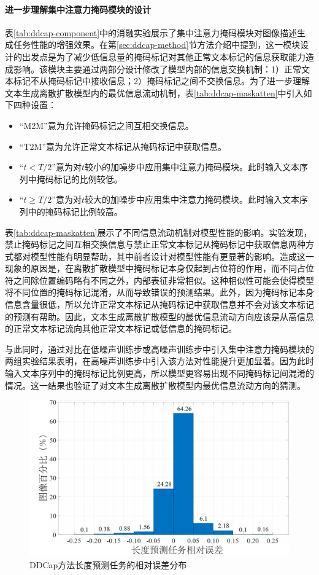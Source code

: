 \paragraph{进一步理解集中注意力掩码模块的设计} 表\ref{tab:ddcap-component}中的消融实验展示了集中注意力掩码模块对图像描述生成任务性能的增强效果。在第\ref{sec:ddcap-method}节方法介绍中提到，这一模块设计的出发点是为了减少低信息量的掩码标记对其他正常文本标记的信息获取能力造成影响。该模块主要通过两部分设计修改了模型内部的信息交换机制：1）正常文本标记不从掩码标记中接收信息；2）掩码标记之间不交换信息。为了进一步理解文本生成离散扩散模型内的最优信息流动机制，表\ref{tab:ddcap-maskatten}中引入如下四种设置：
\begin{itemize}
    \item “M2M”意为允许掩码标记之间互相交换信息。
    \item “T2M”意为允许正常文本标记从掩码标记中获取信息。
    \item “$t < T/2$”意为对$t$较小的加噪步中应用集中注意力掩码模块。此时输入文本序列中掩码标记的比例较低。
    \item “$t\geq T/2$”意为对$t$较大的加噪步中应用集中注意力掩码模块。此时输入文本序列中的掩码标记比例较高。
\end{itemize}
 
表\ref{tab:ddcap-maskatten}展示了不同信息流动机制对模型性能的影响。实验发现，禁止掩码标记之间互相交换信息与禁止正常文本标记从掩码标记中获取信息两种方式都对模型性能有明显帮助，其中前者设计对模型性能有更显著的影响。造成这一现象的原因是，在离散扩散模型中掩码标记本身仅起到占位符的作用，而不同占位符之间除位置编码略有不同之外，内部表征非常相似。这种相似性可能会使得模型将不同位置的掩码标记混淆，从而导致错误的预测结果。此外，因为掩码标记本身信息含量很低，所以允许正常文本标记从掩码标记中获取信息并不会对该文本标记的预测有帮助。因此，文本生成离散扩散模型的最优信息流动方向应该是从高信息的正常文本标记流向其他正常文本标记或低信息的掩码标记。

与此同时，通过对比在低噪声训练步或高噪声训练步中引入集中注意力掩码模块的两组实验结果表明，在高噪声训练步中引入该方法对性能提升更加显著。因为此时输入文本序列中的掩码标记比例更高，所以模型更容易出现不同掩码标记间混淆的情况。这一结果也验证了对文本生成离散扩散模型内最优信息流动方向的猜测。

\begin{figure}
  \centering
  \includegraphics[width=0.7\linewidth]{figures/ddcap-length.pdf}
  \caption{DDCap方法长度预测任务的相对误差分布}
  \label{fig:ddcap-length}
\end{figure}

